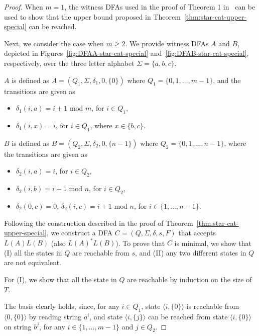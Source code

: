 \documentclass[10pt]{article}
\begin{document}
\begin{proof}
When $m = 1$, the witness DFAs used in the proof of Theorem 1 in~\cite{YuZhSa94} can be used to show that the upper bound proposed in Theorem~\ref{thm:star-cat-upper-special} can be reached.

Next, we consider the case when $m \ge 2$.
We provide witness DFAs $A$ and $B$, depicted in Figures~\ref{fig:DFAA-star-cat-special} and~\ref{fig:DFAB-star-cat-special}, respectively, over the three letter alphabet $\Sigma = \{a,b,c\}$.

$A$ is defined as $A = (Q_1, \Sigma, \delta_1, 0 , \{0\})$ where $Q_1 = \{0,1,\ldots,m-1\}$, and the transitions are given as
    \begin{itemize}
    \item $\delta_1 (i, a) = i+1 \mbox{ mod } m$, for $i \in Q_1$,
    \item $\delta_1 (i, x) = i$, for $i \in Q_1$, where $x \in \{b,c\}$.
    \end{itemize}

$B$ is defined as $B = (Q_2, \Sigma, \delta_2, 0, \{n-1\})$ where $Q_2 = \{0,1,\ldots,n-1\}$, where the transitions are given as
    \begin{itemize}
    \item $\delta_2 (i, a) = i$, for $i \in Q_2$,
    \item $\delta_2 (i, b) = i+1 \mbox{ mod } n$, for $i \in Q_2$,
    \item $\delta_2 (0, c) = 0$, $\delta_2 (i, c) = i+1 \mbox{ mod } n$, for $i \in \{1, \ldots, n-1\}$.
    \end{itemize}

    Following the construction described in the proof of Theorem~\ref{thm:star-cat-upper-special}, we construct a DFA $C = (Q, \Sigma, \delta, s, F)$ that accepts $L(A)L(B)$ (also $L(A)^*L(B)$).
    To prove that $C$ is minimal, we show that (I) all the states in $Q$ are reachable from $s$, and (II) any two different states in $Q$ are not equivalent.

    For (I), we show that all the state in $Q$ are reachable by induction on the size of $T$.

    The basis clearly holds, since, for any $i \in Q_1$, state $\langle i, \{0\} \rangle$ is reachable from $\langle 0, \{0\} \rangle$ by reading string $a^{i}$, and state $\langle i, \{j\} \rangle$ can be reached from state $\langle i, \{0\} \rangle$ on string $b^{j}$, for any $i \in \{1, \ldots, m-1\}$ and $j \in Q_2$.


\end{proof}
\end{document}
